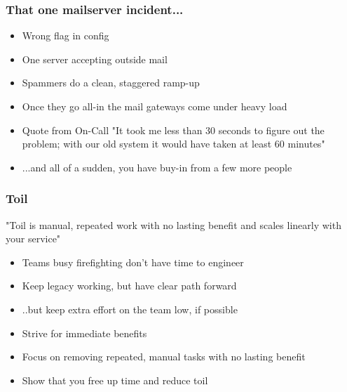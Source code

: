 \documentclass[t]{beamer}
\begin{document}
\begin{frame}
	\frametitle{That one mailserver incident...}
	\begin{itemize}
		\item Wrong flag in config
		\item One server accepting outside mail
		\item Spammers do a clean, staggered ramp-up
		\item Once they go all-in the mail gateways come under heavy load
		\item Quote from On-Call "It took me less than 30 seconds to figure out the problem; with our old system it would have taken at least 60 minutes"
		\item ...and all of a sudden, you have buy-in from a few more people
	\end{itemize}
\end{frame}

\begin{frame}
	\frametitle{Toil}
	"Toil is manual, repeated work with no lasting benefit and scales linearly with your service"
	\vfill
	\begin{itemize}
		\item Teams busy firefighting don't have time to engineer
			\vfill
		\item Keep legacy working, but have clear path forward
		\item ..but keep extra effort on the team low, if possible
		\item Strive for immediate benefits
		\item Focus on removing repeated, manual tasks with no lasting benefit
		\item Show that you free up time and reduce toil
	\end{itemize}
	\vfill
\end{frame}
\end{document}
